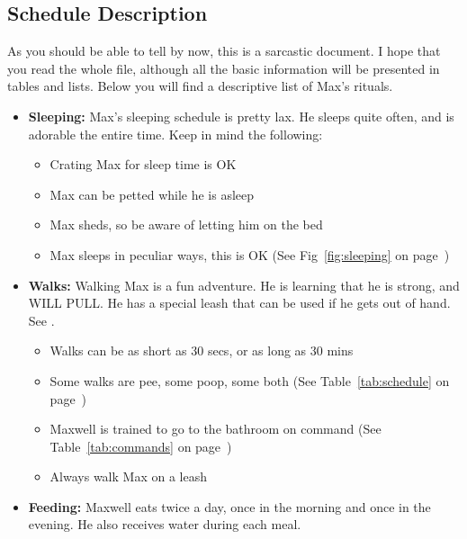 \documentclass[pdftex,12pt]{article}
\begin{document}
\pagebreak

\subsection{Schedule Description}

As you should be able to tell by now, this is a sarcastic document. I hope that
you read the whole file, although all the basic information will be presented in
tables and lists. Below you will find a descriptive list of Max's rituals.

\bigskip

\begin{itemize}\label{itm:schedule}
    \item \textbf{Sleeping:} Max's sleeping schedule is pretty lax. He sleeps 
        quite often, and is adorable the entire time. Keep in mind the following:
        \begin{itemize}
            \item Crating Max for sleep time is OK
            \item Max can be petted while he is asleep
            \item Max sheds, so be aware of letting him on the bed
            \item Max sleeps in peculiar ways, this is OK
                  (See Fig~\ref{fig:sleeping} on page~\pageref{fig:sleeping})
        \end{itemize}
    \item \textbf{Walks:} Walking Max is a fun adventure. He is learning that he
        is strong, and WILL PULL. He has a special leash that can be used if he 
        gets out of hand. See .
        \begin{itemize}
            \item Walks can be as short as 30 secs, or as long as 30 mins
            \item Some walks are pee, some poop, some both
                  (See Table~\ref{tab:schedule} on page~\pageref{tab:schedule})
            \item Maxwell is trained to go to the bathroom on command
                  (See Table~\ref{tab:commands} on page~\pageref{tab:commands})
            \item Always walk Max on a leash
        \end{itemize}
    \item \textbf{Feeding:} Maxwell eats twice a day, once in the morning and
        once in the evening. He also receives water during each meal.

\end{itemize}
\end{document}
